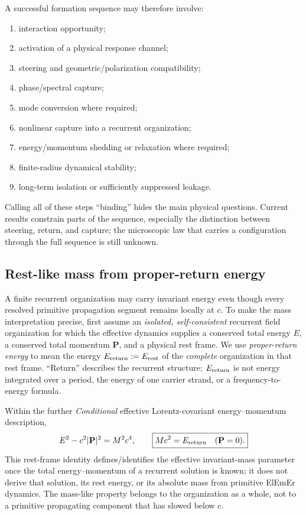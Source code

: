 \documentclass[11pt]{article}
\theoremstyle{definition}
\newcommand{\ElEmEr}{\mbox{ElEmEr}}
\begin{document}
A successful formation sequence may therefore involve:
\begin{enumerate}[label=(\roman*)]
  \item interaction opportunity;
  \item activation of a physical response channel;
  \item steering and geometric/polarization compatibility;
  \item phase/spectral capture;
  \item mode conversion where required;
  \item nonlinear capture into a recurrent organization;
  \item energy/momentum shedding or relaxation where required;
  \item finite-radius dynamical stability;
  \item long-term isolation or sufficiently suppressed leakage.
\end{enumerate}

Calling all of these steps ``binding'' hides the main physical questions.  Current results
constrain parts of the sequence, especially the distinction between steering, return, and
capture; the microscopic law that carries a configuration through the full sequence is
still unknown.

\subsection{Rest-like mass from proper-return energy}
\label{subsec:mass_inertia}

A finite recurrent organization may carry invariant energy even though every
resolved primitive propagation segment remains locally at $c$.  To make the
mass interpretation precise, first assume an \emph{isolated, self-consistent}
recurrent field organization for which the effective dynamics supplies a
conserved total energy $E$, a conserved total momentum $\mathbf P$, and a
physical rest frame.  We use \emph{proper-return energy} to mean the energy
$E_{\rm return}:=E_{\rm rest}$ of the \emph{complete} organization in that
rest frame.  ``Return'' describes the recurrent structure; $E_{\rm return}$
is not energy integrated over a period, the energy of one carrier strand, or a
frequency-to-energy formula.

Within the further \emph{Conditional} effective Lorentz-covariant
energy--momentum description,
\begin{equation}
  E^2-c^2|\mathbf P|^2=M^2c^4,
  \qquad
  \boxed{Mc^2=E_{\rm return}\quad(\mathbf P=0).}
  \label{eq:mass_return}
\end{equation}
This rest-frame identity defines/identifies the effective invariant-mass
parameter once the total energy--momentum of a recurrent solution is known;
it does not derive that solution, its rest energy, or its absolute mass from
primitive \ElEmEr{} dynamics.  The mass-like property belongs to the
organization as a whole, not to a primitive propagating component that has
slowed below $c$.
\end{document}
